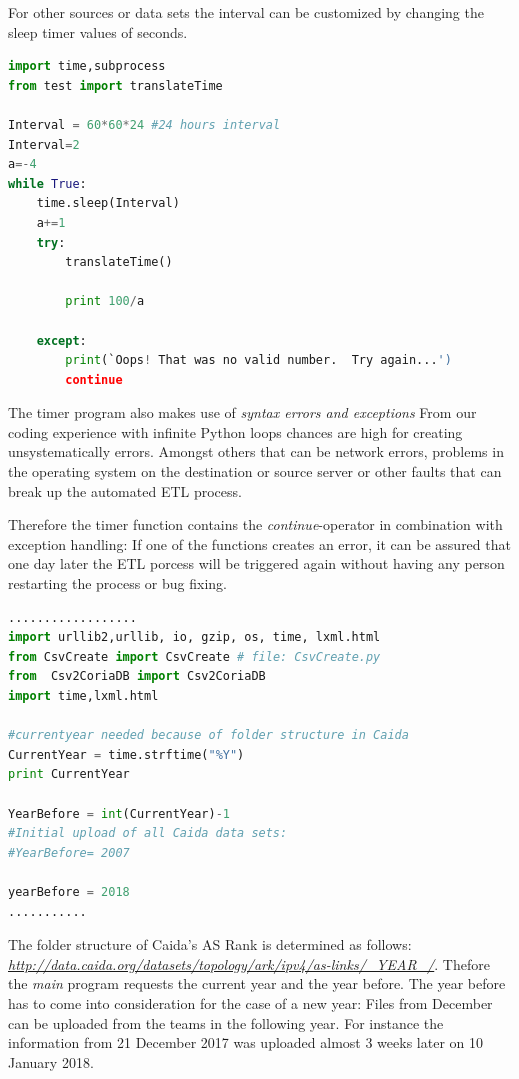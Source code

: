 \documentclass[conference, 11pt]{IEEEtran}
\begin{document}
For other sources or data sets the interval can be customized by changing the sleep timer values of seconds.


\begin{lstlisting}[language=Python]
import time,subprocess
from test import translateTime

Interval = 60*60*24 #24 hours interval
Interval=2
a=-4
while True:
	time.sleep(Interval)
	a+=1
	try:
		translateTime()

		print 100/a
		
	except:
		print(`Oops! That was no valid number.  Try again...')
		continue

\end{lstlisting}


The timer program also makes use of \textit{syntax errors and exceptions} %
From our coding experience with infinite Python loops chances are high for creating unsystematically errors. Amongst others that can be network errors, problems in the operating system on the destination or source server or other faults that can break up the automated ETL process.

Therefore the timer function contains the \textit{continue}-operator in combination with exception handling: If one of the functions creates an error, it can be assured that one day later the ETL porcess will be triggered again without having any person restarting the process or bug fixing. \linebreak
\linebreak
\linebreak

\begin{lstlisting}[language=Python, caption={...},captionpos=b, xleftmargin=.02\textwidth, linewidth = 0.95\columnwidth]
..................
import urllib2,urllib, io, gzip, os, time, lxml.html
from CsvCreate import CsvCreate # file: CsvCreate.py
from  Csv2CoriaDB import Csv2CoriaDB
import time,lxml.html

#currentyear needed because of folder structure in Caida
CurrentYear = time.strftime("%Y")
print CurrentYear

YearBefore = int(CurrentYear)-1
#Initial upload of all Caida data sets:
#YearBefore= 2007

yearBefore = 2018
...........
\end{lstlisting}

The folder structure of Caida's AS Rank is determined as follows: \textit{\url{http://data.caida.org/datasets/topology/ark/ipv4/as-links/_YEAR_/}}. Thefore the \textit{main} program requests the current year and the year before. The year before has to come into consideration for the case of a new year: Files from December can be uploaded from the teams in the following year. For instance the information from 21 December 2017 was uploaded almost 3 weeks later on 10 January 2018.
\end{document}
